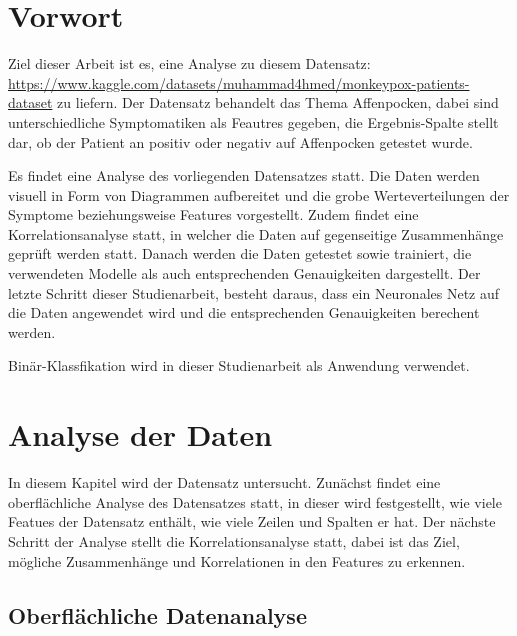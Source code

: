\documentclass[13pt,a4paper, listof=entryprefix, bibliography=totocnumbered,toc=listofnumbered,lof=listofnumbered]{scrartcl}
\begin{document}

	\section{Vorwort}
		\label{ch:vorwort}

Ziel dieser Arbeit ist es, eine Analyse zu diesem Datensatz: \linebreak \url{https://www.kaggle.com/datasets/muhammad4hmed/monkeypox-patients-dataset}  
zu liefern. Der Datensatz behandelt das Thema Affenpocken, dabei sind unterschiedliche Symptomatiken als Feautres gegeben, die Ergebnis-Spalte stellt dar, ob 
der Patient an positiv oder negativ auf Affenpocken getestet wurde.

Es findet eine Analyse des vorliegenden Datensatzes statt.  Die Daten werden visuell in Form von Diagrammen aufbereitet und die grobe Werteverteilungen
der Symptome beziehungsweise Features vorgestellt. Zudem findet eine Korrelationsanalyse statt, in welcher die 
Daten auf gegenseitige Zusammenhänge geprüft werden statt. Danach werden die Daten getestet sowie trainiert, die
verwendeten Modelle als auch entsprechenden Genauigkeiten dargestellt. Der letzte Schritt dieser Studienarbeit,
besteht daraus, dass ein Neuronales Netz auf die Daten angewendet wird und die entsprechenden Genauigkeiten
berechent werden. 

Binär-Klassfikation wird in dieser Studienarbeit als Anwendung verwendet. 
	

	\section{Analyse der Daten}
		\label{ch:analyse_daten}

In diesem Kapitel wird der Datensatz untersucht. Zunächst findet eine oberflächliche Analyse des Datensatzes statt, in dieser
wird festgestellt, wie viele Featues der Datensatz enthält, wie viele Zeilen und Spalten er hat. Der nächste Schritt der Analyse stellt die Korrelationsanalyse
statt, dabei ist das Ziel, mögliche Zusammenhänge und Korrelationen in den Features zu erkennen. 

	\subsection{Oberflächliche Datenanalyse}
		\label{ch:oberflaechliche_analyse}
\end{document}
